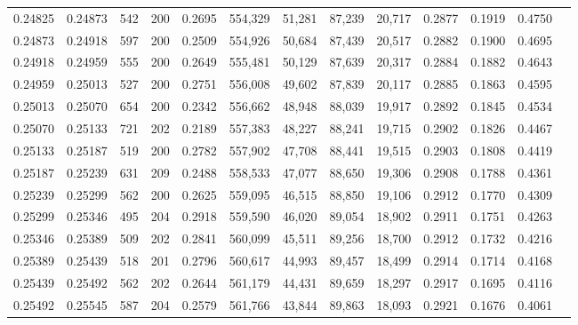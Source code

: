 \begin{tabular}{rrrrrrrrrrrrr}
0.24825 & 0.24873 &   542 & 200 &                                     0.2695 & 554,329 &  51,281 &  87,239 &  20,717 & 0.2877 & 0.1919 & 0.4750 \\
0.24873 & 0.24918 &   597 & 200 &                                     0.2509 & 554,926 &  50,684 &  87,439 &  20,517 & 0.2882 & 0.1900 & 0.4695 \\
0.24918 & 0.24959 &   555 & 200 &                                     0.2649 & 555,481 &  50,129 &  87,639 &  20,317 & 0.2884 & 0.1882 & 0.4643 \\
0.24959 & 0.25013 &   527 & 200 &                                     0.2751 & 556,008 &  49,602 &  87,839 &  20,117 & 0.2885 & 0.1863 & 0.4595 \\
0.25013 & 0.25070 &   654 & 200 &                                     0.2342 & 556,662 &  48,948 &  88,039 &  19,917 & 0.2892 & 0.1845 & 0.4534 \\
0.25070 & 0.25133 &   721 & 202 &                                     0.2189 & 557,383 &  48,227 &  88,241 &  19,715 & 0.2902 & 0.1826 & 0.4467 \\
0.25133 & 0.25187 &   519 & 200 &                                     0.2782 & 557,902 &  47,708 &  88,441 &  19,515 & 0.2903 & 0.1808 & 0.4419 \\
0.25187 & 0.25239 &   631 & 209 &                                     0.2488 & 558,533 &  47,077 &  88,650 &  19,306 & 0.2908 & 0.1788 & 0.4361 \\
0.25239 & 0.25299 &   562 & 200 &                                     0.2625 & 559,095 &  46,515 &  88,850 &  19,106 & 0.2912 & 0.1770 & 0.4309 \\
0.25299 & 0.25346 &   495 & 204 &                                     0.2918 & 559,590 &  46,020 &  89,054 &  18,902 & 0.2911 & 0.1751 & 0.4263 \\
0.25346 & 0.25389 &   509 & 202 &                                     0.2841 & 560,099 &  45,511 &  89,256 &  18,700 & 0.2912 & 0.1732 & 0.4216 \\
0.25389 & 0.25439 &   518 & 201 &                                     0.2796 & 560,617 &  44,993 &  89,457 &  18,499 & 0.2914 & 0.1714 & 0.4168 \\
0.25439 & 0.25492 &   562 & 202 &                                     0.2644 & 561,179 &  44,431 &  89,659 &  18,297 & 0.2917 & 0.1695 & 0.4116 \\
0.25492 & 0.25545 &   587 & 204 &                                     0.2579 & 561,766 &  43,844 &  89,863 &  18,093 & 0.2921 & 0.1676 & 0.4061 \\

\end{tabular}
